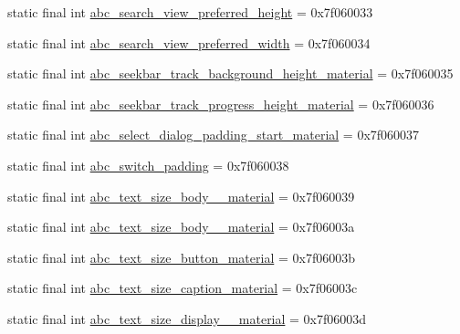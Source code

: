 \begin{DoxyCompactItemize}
\item 
static final int \mbox{\hyperlink{classandroid_1_1support_1_1v7_1_1appcompat_1_1_r_1_1dimen_ab855b029bb245c83debdcc554a7b40e7}{abc\+\_\+search\+\_\+view\+\_\+preferred\+\_\+height}} = 0x7f060033
\item 
static final int \mbox{\hyperlink{classandroid_1_1support_1_1v7_1_1appcompat_1_1_r_1_1dimen_acc05237c67c19808a867d37cfe0f18db}{abc\+\_\+search\+\_\+view\+\_\+preferred\+\_\+width}} = 0x7f060034
\item 
static final int \mbox{\hyperlink{classandroid_1_1support_1_1v7_1_1appcompat_1_1_r_1_1dimen_a9acb31a916e1655607b008b15a477f93}{abc\+\_\+seekbar\+\_\+track\+\_\+background\+\_\+height\+\_\+material}} = 0x7f060035
\item 
static final int \mbox{\hyperlink{classandroid_1_1support_1_1v7_1_1appcompat_1_1_r_1_1dimen_a93d886dc13826a74ce97e7dddb0d699c}{abc\+\_\+seekbar\+\_\+track\+\_\+progress\+\_\+height\+\_\+material}} = 0x7f060036
\item 
static final int \mbox{\hyperlink{classandroid_1_1support_1_1v7_1_1appcompat_1_1_r_1_1dimen_a8873d44fdbd5c89f6cb77c11a76ad403}{abc\+\_\+select\+\_\+dialog\+\_\+padding\+\_\+start\+\_\+material}} = 0x7f060037
\item 
static final int \mbox{\hyperlink{classandroid_1_1support_1_1v7_1_1appcompat_1_1_r_1_1dimen_a410e47edf1b65780848bbb4c9f79252c}{abc\+\_\+switch\+\_\+padding}} = 0x7f060038
\item 
static final int \mbox{\hyperlink{classandroid_1_1support_1_1v7_1_1appcompat_1_1_r_1_1dimen_ab4f998523b1a531044f5740429ff31e1}{abc\+\_\+text\+\_\+size\+\_\+body\+\_\+\_\+material}} = 0x7f060039
\item 
static final int \mbox{\hyperlink{classandroid_1_1support_1_1v7_1_1appcompat_1_1_r_1_1dimen_aef8ce3f43ce7679b6db3d520871ff677}{abc\+\_\+text\+\_\+size\+\_\+body\+\_\+\_\+material}} = 0x7f06003a
\item 
static final int \mbox{\hyperlink{classandroid_1_1support_1_1v7_1_1appcompat_1_1_r_1_1dimen_aef7a187b695f9a1e0478bfa4c883d0d9}{abc\+\_\+text\+\_\+size\+\_\+button\+\_\+material}} = 0x7f06003b
\item 
static final int \mbox{\hyperlink{classandroid_1_1support_1_1v7_1_1appcompat_1_1_r_1_1dimen_a46ea30bfdc5baacefc0d32d3ce1ba88c}{abc\+\_\+text\+\_\+size\+\_\+caption\+\_\+material}} = 0x7f06003c
\item 
static final int \mbox{\hyperlink{classandroid_1_1support_1_1v7_1_1appcompat_1_1_r_1_1dimen_a43b54457d6e97f9b1b66699cf5c99e5d}{abc\+\_\+text\+\_\+size\+\_\+display\+\_\+\_\+material}} = 0x7f06003d

\end{DoxyCompactItemize}
